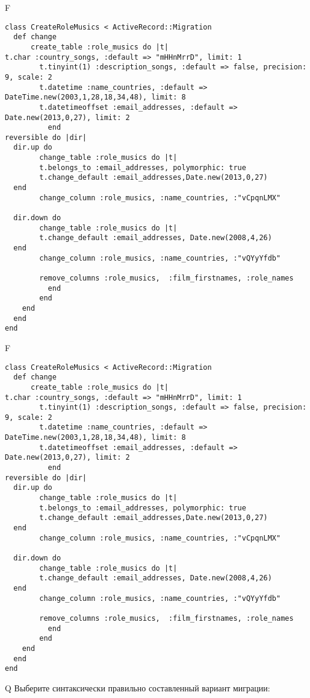 F
\begin{verbatim}
class CreateRoleMusics < ActiveRecord::Migration
  def change
	  create_table :role_musics do |t|
t.char :country_songs, :default => "mHHnMrrD", limit: 1
		t.tinyint(1) :description_songs, :default => false, precision: 9, scale: 2
		t.datetime :name_countries, :default => DateTime.new(2003,1,28,18,34,48), limit: 8
		t.datetimeoffset :email_addresses, :default => Date.new(2013,0,27), limit: 2
		  end
reversible do |dir|
  dir.up do
		change_table :role_musics do |t|
		t.belongs_to :email_addresses, polymorphic: true
 		t.change_default :email_addresses,Date.new(2013,0,27)
  end
 		change_column :role_musics, :name_countries, :"vCpqnLMX"
   
  dir.down do
		change_table :role_musics do |t|
		t.change_default :email_addresses, Date.new(2008,4,26)
  end
 		change_column :role_musics, :name_countries, :"vQYyYfdb"
   
		remove_columns :role_musics,  :film_firstnames, :role_names 
	      end
	    end
    end 
  end
end

\end{verbatim}

F
\begin{verbatim}
class CreateRoleMusics < ActiveRecord::Migration
  def change
	  create_table :role_musics do |t|
t.char :country_songs, :default => "mHHnMrrD", limit: 1
		t.tinyint(1) :description_songs, :default => false, precision: 9, scale: 2
		t.datetime :name_countries, :default => DateTime.new(2003,1,28,18,34,48), limit: 8
		t.datetimeoffset :email_addresses, :default => Date.new(2013,0,27), limit: 2
		  end
reversible do |dir|
  dir.up do
		change_table :role_musics do |t|
		t.belongs_to :email_addresses, polymorphic: true
 		t.change_default :email_addresses,Date.new(2013,0,27)
  end
 		change_column :role_musics, :name_countries, :"vCpqnLMX"
   
  dir.down do
		change_table :role_musics do |t|
		t.change_default :email_addresses, Date.new(2008,4,26)
  end
 		change_column :role_musics, :name_countries, :"vQYyYfdb"
   
		remove_columns :role_musics,  :film_firstnames, :role_names 
	      end
	    end
    end 
  end
end

\end{verbatim}

Q
Выберите синтаксически правильно составленный вариант миграции:

